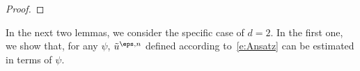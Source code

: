 \documentclass[reqno,11pt]{preprint}
\newcommand{\cA}{\mathcal{A}}
\newcommand{\cH}{\mathcal{H}}
\newcommand{\cL}{\mathcal{L}}
\newcommand{\1}{\mathds{1}}
\newcommand{\genap}{\cA^{\eps}_+}
\begin{document}
\begin{proof}
\end{proof}

In the next two lemmas, we consider the specific case of $d=2$. 
In the first one, we show that, for any $\psi$, $\tilde u^{\eps,n}$ defined according to~\eqref{e:Ansatz} 
can be estimated in terms of $\psi$. 
\end{document}
